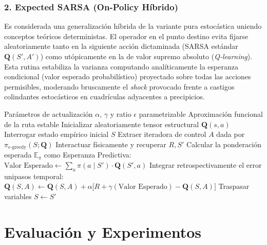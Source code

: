 \subsubsection{2. Expected SARSA (On-Policy Híbrido)}
Es considerada una generalización híbrida de la variante pura estocástica uniendo conceptos teóricos deterministas. El operador en el punto destino evita fijarse aleatoriamente tanto en la siguiente acción dictaminada (SARSA estándar $\mathbf{Q}(S', A')$) como utópicamente en la de valor supremo absoluto (\textit{Q-learning}). Esta rutina estabiliza la varianza computando analíticamente la esperanza condicional (valor esperado probabilístico) proyectado sobre todas las acciones permisibles, moderando bruscamente el \textit{shock} provocado frente a castigos colindantes estocásticos en cuadrículas adyacentes a precipicios.

\begin{algorithm}[H]
\caption{Expected SARSA}
\label{alg:expected_sarsa}
\begin{algorithmic}[1]
\Require Parámetros de actualización $\alpha$, $\gamma$ y ratio $\epsilon$ parametrizable
\Ensure Aproximación funcional de la ruta estable
\State Inicializar aleatoriamente tensor estructural $\mathbf{Q}(s, a)$
    \State Interrogar estado empírico inicial $S$
        \State Extraer iteradora de control $A$ dada por $\pi_{\epsilon\text{-greedy}}(S; \mathbf{Q})$
        \State Interactuar físicamente y recuperar $R, S'$
        \State Calcular la ponderación esperada $\mathbb{E}_{\pi}$ como Esperanza Predictiva:
        \State $\text{Valor Esperado} \leftarrow \sum_{a} \pi(a \mid S') \cdot \mathbf{Q}(S', a)$
        \State Integrar retrospectivamente el error unipasos temporal:
        \State $\mathbf{Q}(S, A) \leftarrow \mathbf{Q}(S, A) + \alpha \big[ R + \gamma (\text{Valor Esperado}) - \mathbf{Q}(S, A) \big]$
        \State Traspasar variables $S \leftarrow S'$
    \EndWhile
\EndFor
\end{algorithmic}
\end{algorithm}

\section{Evaluación y Experimentos}

